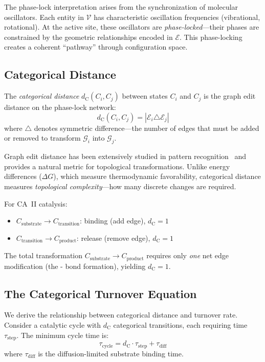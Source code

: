 \documentclass[twocolumn,amsmath,amssymb,aps,prb,superscriptaddress,longbibliography]{revtex4-2}
\newcommand{\dC}{d_{\mathrm{C}}}
\newcommand{\calG}{\mathcal{G}}
\newcommand{\calV}{\mathcal{V}}
\newcommand{\calE}{\mathcal{E}}
\begin{document}
The phase-lock interpretation arises from the synchronization of molecular oscillators. Each entity in $\calV$ has characteristic oscillation frequencies (vibrational, rotational). At the active site, these oscillators are \emph{phase-locked}---their phases are constrained by the geometric relationships encoded in $\calE$. This phase-locking creates a coherent ``pathway'' through configuration space.

\subsection{Categorical Distance}
\label{sec:categorical-distance}

The \emph{categorical distance} $\dC(C_i, C_j)$ between states $C_i$ and $C_j$ is the graph edit distance on the phase-lock network:
\begin{equation}
\dC(C_i, C_j) = |\calE_i \triangle \calE_j|
\label{eq:dc-def}
\end{equation}
where $\triangle$ denotes symmetric difference---the number of edges that must be added or removed to transform $\calG_i$ into $\calG_j$.

Graph edit distance has been extensively studied in pattern recognition~\cite{Gao2010} and provides a natural metric for topological transformations. Unlike energy differences ($\Delta G$), which measure thermodynamic favorability, categorical distance measures \emph{topological complexity}---how many discrete changes are required.

For CA~II catalysis:
\begin{itemize}
\item $C_{\text{substrate}} \to C_{\text{transition}}$:  binding (add  edge), $\dC = 1$
\item $C_{\text{transition}} \to C_{\text{product}}$:  release (remove  edge), $\dC = 1$
\end{itemize}

The total transformation $C_{\text{substrate}} \to C_{\text{product}}$ requires only \emph{one} net edge modification (the - bond formation), yielding $\dC = 1$.

\subsection{The Categorical Turnover Equation}

We derive the relationship between categorical distance and turnover rate. Consider a catalytic cycle with $\dC$ categorical transitions, each requiring time $\tau_{\text{step}}$. The minimum cycle time is:
\begin{equation}
\tau_{\text{cycle}} = \dC \cdot \tau_{\text{step}} + \tau_{\text{diff}}
\label{eq:tau-cycle}
\end{equation}
where $\tau_{\text{diff}}$ is the diffusion-limited substrate binding time.
\end{document}
